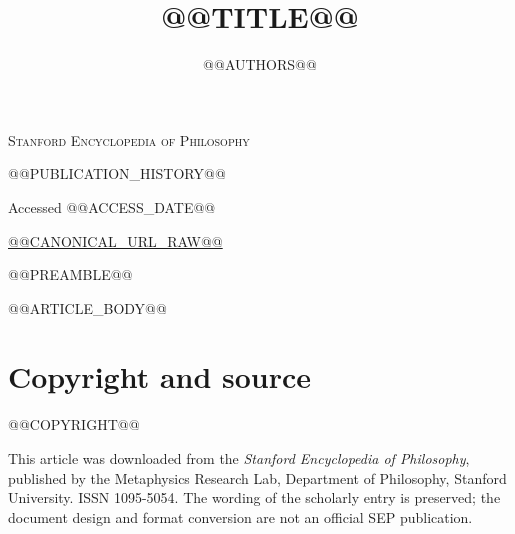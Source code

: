 \documentclass[letterpaper,11pt,leqno]{article}
\begin{document}
\title{@@TITLE@@}
\author{@@AUTHORS@@}
\date{}

\begin{titlepage}
\maketitle

\begin{sepmetadata}
\textsc{Stanford Encyclopedia of Philosophy}\par
@@PUBLICATION_HISTORY@@\par
Accessed @@ACCESS_DATE@@\par
\url{@@CANONICAL_URL_RAW@@}
\end{sepmetadata}

\vspace{1.5em}
@@PREAMBLE@@
\end{titlepage}

\clearpage
\tableofcontents
\clearpage

@@ARTICLE_BODY@@

\clearpage
{}
{}
\section*{Copyright and source}

@@COPYRIGHT@@

\medskip
This article was downloaded from the \emph{Stanford Encyclopedia of Philosophy},
published by the Metaphysics Research Lab, Department of Philosophy,
Stanford University. ISSN 1095-5054. The wording of the scholarly entry is
preserved; the document design and format conversion are not an official SEP
publication.
\end{document}
